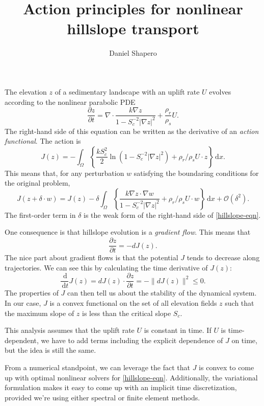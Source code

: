 \documentclass{article}
\title{Action principles for nonlinear hillslope transport}
\author{Daniel Shapero}
\date{}
\theoremstyle{definition}
\theoremstyle{plain}
\newcommand{\ud}{\hspace{2pt}\mathrm{d}}
\begin{document}
\maketitle

The elevation $z$ of a sedimentary landscape with an uplift rate $U$ evolves according to the nonlinear parabolic PDE
\begin{equation}
    \frac{\partial z}{\partial t} = \nabla\cdot\frac{k\nabla z}{1 - S_c^{-2}|\nabla z|^2} + \frac{\rho_r}{\rho_s}U.
\label{hillslope-eqn}\end{equation}
The right-hand side of this equation can be written as the derivative of an \emph{action functional}.
The action is
\begin{equation}
    J(z) = -\int_\Omega\left\{\frac{k S_c^2}{2}\ln\left(1 - S_c^{-2}|\nabla z|^2\right) + \rho_r/\rho_s U\cdot z\right\}\ud x.
\end{equation}
This means that, for any perturbation $w$ satisfying the boundaring conditions for the original problem,
\begin{equation}
    J(z + \delta\cdot w) = J(z) - \delta\int_\Omega\left\{\frac{k\nabla z\cdot \nabla w}{1 - S_c^{-2}|\nabla z|^2} + \rho_r/\rho_s U\cdot w\right\}\ud x + \mathcal{O}(\delta^2).
\end{equation}
The first-order term in $\delta$ is the weak form of the right-hand side of \eqref{hillslope-eqn}.

One consequence is that hillslope evolution is a \emph{gradient flow}.
This means that
\begin{equation}
    \frac{\partial z}{\partial t} = -dJ(z).
\end{equation}
The nice part about gradient flows is that the potential $J$ tends to decrease along trajectories.
We can see this by calculating the time derivative of $J(z)$:
\begin{equation}
    \frac{\ud}{\ud t}J(z) = dJ(z)\cdot\frac{\partial z}{\partial t} = -\|dJ(z)\|^2 \le 0.
\end{equation}
The properties of $J$ can then tell us about the stability of the dynamical system.
In our case, $J$ is a convex functional on the set of all elevation fields $z$ such that the maximum slope of $z$ is less than the critical slope $S_c$.

This analysis assumes that the uplift rate $U$ is constant in time.
If $U$ is time-dependent, we have to add terms including the explicit dependence of $J$ on time, but the idea is still the same.

From a numerical standpoint, we can leverage the fact that $J$ is convex to come up with optimal nonlinear solvers for \eqref{hillslope-eqn}.
Additionally, the variational formulation makes it easy to come up with an implicit time discretization, provided we're using either spectral or finite element methods.
\end{document}
